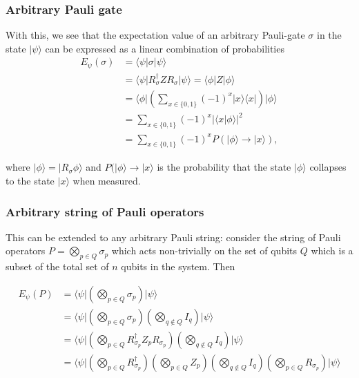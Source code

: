 \documentclass{beamer}
\begin{document}
\begin{frame}
\frametitle{Arbitrary Pauli gate}

With this, we see that the expectation value of an arbitrary
Pauli-gate $\sigma$ in the state $\vert\psi\rangle$ can be expressed as a linear combination of probabilities
\begin{align*}
E_{\psi}(\sigma)
&= \langle \psi\vert\sigma\vert\psi\rangle \nonumber \\
&=\langle\psi\vert R_{\sigma}^{\dagger}ZR_{\sigma}\vert\psi\rangle =\langle \phi\vert Z\vert \phi\rangle \nonumber \\
&=\langle\phi\vert\left(\sum_{x\in\{0,1\}}(-1)^x\vert x\rangle\langle x\vert\right)\vert\phi\rangle \nonumber \\
&=\sum_{x\in\{0,1\}}(-1)^x\vert\langle x\vert \phi\rangle\vert^2\nonumber \\
&=\sum_{x\in\{0,1\}}(-1)^xP(\vert \phi\rangle\to\vert x\rangle),
\end{align*}

where $\vert \phi\rangle=\vert R_\sigma\phi\rangle$ and
$P(\vert \phi\rangle\to\vert x\rangle$ is the probability that the state
$\vert \phi\rangle$ collapses to the state $\vert x\rangle$ when measured.
\end{frame}

\begin{frame}
\frametitle{Arbitrary string of Pauli operators}

This can
be extended to any arbitrary Pauli string: consider the string of
Pauli operators $P=\bigotimes_{p\in Q}\sigma_p$ which acts
non-trivially on the set of qubits $Q$ which is a subset of the total
set of $n$ qubits in the system. Then

\begin{align*}
E_{\psi}\left(P\right)
&=\langle \psi\vert\left(\bigotimes_{p\in Q}\sigma_p\right)\vert \psi\rangle \nonumber \\
&=\langle \psi\vert\left(\bigotimes_{p\in Q}\sigma_p\right)
\left(\bigotimes_{q\notin Q}I_q\right)\vert \psi\rangle \nonumber \\
&=\langle \psi\vert\left(\bigotimes_{p \in Q}R_{\sigma_p}^{\dagger}Z_pR_{\sigma_p}\right)
\left(\bigotimes_{q\notin Q}I_q\right)\vert \psi\rangle \nonumber \\
&=
\langle \psi\vert\left(\bigotimes_{p \in Q}R_{\sigma_p}^{\dagger}\right)
\left(\bigotimes_{p \in Q}Z_p\right)
\left(\bigotimes_{q\notin Q}I_q\right)
\left(\bigotimes_{p \in Q}R_{\sigma_p}\right)\vert \psi\rangle \nonumber 
\end{align*}
\end{frame}
\end{document}
